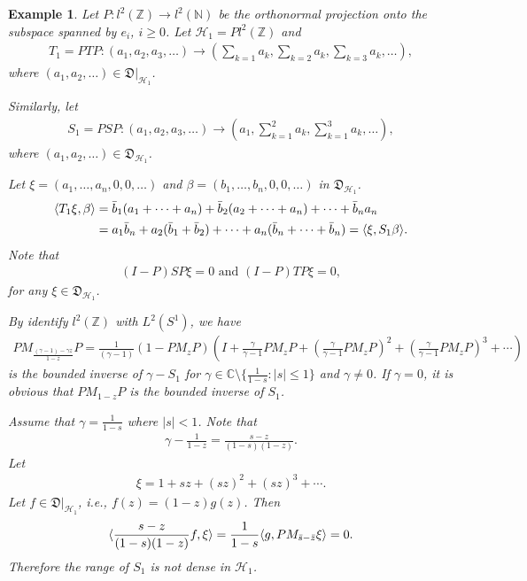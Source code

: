 \documentclass[a4paper,10pt]{amsart}
\newtheorem{example}{Example}[section]
\newcommand{\HHH}{\mathcal H} %
\newcommand{\DDD}{\mathfrak D}
\newcommand{\C}{\mathbb C} %
\newcommand{\Z}{\mathbb Z} %
\newcommand{\N}{\mathbb N} %
\begin{document}
\begin{example}
    Let $P: l^{2}(\Z) \to l^{2}(\N)$ be the orthonormal projection onto
    the subspace spanned by $e_i$, $i \geq 0$.
    Let $\HHH_{1} = Pl^{2}(\Z)$ and 
    \begin{align*}
    T_1 = PTP : (a_1, a_2, a_3, \ldots ) \to (\sum_{k=1}a_k,\sum_{k=2}a_k,
    \sum_{k=3}a_k, \ldots),
    \end{align*}
    where $(a_1, a_2, \ldots) \in \DDD|_{\HHH_1}$.

    Similarly, let
    \begin{align*}
        S_1 = PSP : (a_1, a_2, a_3, \ldots ) \to (a_1,\sum_{k=1}^{2}a_k,
        \sum_{k=1}^{3}a_k, \ldots),
    \end{align*}
    where $(a_1, a_2, \ldots) \in \DDD_{\HHH_1}$.

    Let $\xi = (a_1, \ldots, a_n, 0, 0, \ldots)$ 
    and $\beta = (b_1, \ldots, b_n, 0, 0, \ldots)$ in $\DDD_{\HHH_1}$.
    \begin{align*}
        \langle T_1 \xi, \beta \rangle &= \Bar{b}_{1}(a_1 + \cdots + a_n)
        + \Bar{b}_{2}(a_2 + \cdots + a_n) + \cdots + \Bar{b}_{n}a_n \\
        & = a_{1}\Bar{b}_{n} + a_{2}(\Bar{b}_{1} + \Bar{b}_{2}) + \cdots + 
        a_{n}(\Bar{b}_{n} + \cdots + \Bar{b}_{n}) = 
        \langle \xi, S_1 \beta \rangle.
    \end{align*}
    Note that 
    \begin{align*}
        (I-P)SP\xi = 0 \mbox{ and } (I-P)TP \xi = 0, 
    \end{align*} 
    for any $\xi \in \DDD_{\HHH_1}$.
    
    By identify $l^2(\Z)$ with $L^{2}(S^1)$, we have
    \begin{align*}
        PM_{\frac{(\gamma -1)-\gamma z}{1-z}}P = 
        \frac{1}{(\gamma -1)}(1-PM_{z}P)(I + \frac{\gamma}{\gamma-1}PM_{z}P
        + (\frac{\gamma}{\gamma-1}PM_{z}P)^{2} 
        + (\frac{\gamma}{\gamma-1}PM_{z}P)^{3}
        + \cdots)     
    \end{align*}
    is the bounded inverse of $\gamma - S_1$ for $\gamma \in \C 
    \setminus \{\frac{1}{1-s} : |s| \leq 1 \}$ and $\gamma \neq 0$.
    If $\gamma = 0$, it is obvious that $PM_{1-z}P$ is the bounded 
    inverse of $S_1$.

    Assume that $\gamma = \frac{1}{1-s}$ where $|s| < 1$. Note that
    \begin{align*}
        \gamma - \frac{1}{1-z} = \frac{s-z}{(1-s)(1-z)}. 
    \end{align*}
    Let
    \begin{align*}
        \xi = 1 + sz + (sz)^2 + (sz)^3 + \cdots. 
    \end{align*} 
    Let $f \in \DDD|_{\HHH_1}$, i.e., $f(z) = (1-z)g(z)$. Then
    \begin{align*}
       \langle  \frac{s-z}{(1-s)(1-z)} f, \xi \rangle = 
       \frac{1}{1-s}\langle g, PM_{\Bar{s} - \Bar{z}} \xi \rangle = 0.   
    \end{align*}
    Therefore the range of $S_1$ is not dense in $\HHH_1$.
\end{example}
\end{document}

